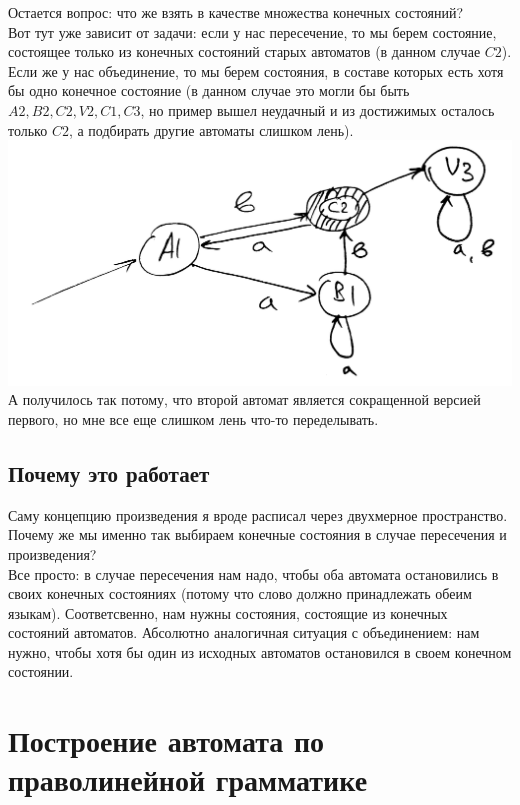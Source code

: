\documentclass[14pt]{extreport}
\begin{document}
	Остается вопрос: что же взять в качестве множества конечных состояний?\\
	Вот тут уже зависит от задачи: если у нас пересечение, то мы берем состояние, состоящее
	только из конечных состояний старых автоматов (в данном случае $C2$).\\
	Если же у нас объединение, то мы берем состояния, в составе которых есть хотя бы одно
	конечное состояние (в данном случае это могли бы быть $A2, B2, C2, V2, C1, C3$, но
	пример вышел неудачный и из достижимых осталось только $C2$, а подбирать другие
	автоматы слишком лень).\\
	\includegraphics[scale=0.09]{data/pic5_7.png}\\
	А получилось так потому, что второй автомат является сокращенной версией
	первого, но мне все еще слишком лень что-то переделывать.\\
	\section{Почему это работает}
	Саму концепцию произведения я вроде расписал через двухмерное пространство. Почему же мы
	именно так выбираем конечные состояния в случае пересечения и произведения?\\
	Все просто: в случае пересечения нам надо, чтобы оба автомата остановились в своих конечных
	состояниях (потому что слово должно принадлежать обеим языкам). Соответсвенно, нам нужны
	состояния, состоящие из конечных состояний автоматов. Абсолютно аналогичная ситуация с
	объединением: нам нужно, чтобы хотя бы один из исходных автоматов остановился в своем
	конечном состоянии.
	
	\chapter{Построение автомата по праволинейной грамматике}
\end{document}
